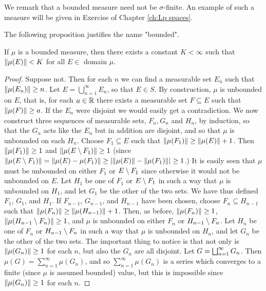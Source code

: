 We remark that a bounded measure need not be $\sigma$-finite. An example of such a measure will be given in Exercise of Chapter \ref{ch:Lp spaces}.

The following proposition justifies the name "bounded".

\begin{proposition}
\label{prop:bounded measure are bounded}
If $\mu$ is a bounded measure, then there exists a constant $K<\infty$ such that $\norm{\mu(E)}<K$ for all $E \in$ domain $\mu$.
\end{proposition}

\begin{proof}
Suppose not. Then for each $n$ we can find a measurable set $E_n$ such that $\norm{\mu(E_n)}\geq n$. Let $E=\bigcup_{n=1}^\infty E_n$, so that $E \in S$. By construction, $\mu$ is unbounded on $E$, that is, for each $a\in\mathbb{R}$ there exists a measurable set $F \subseteq E$ such that $\norm{\mu(F)}\geq a$. If the $E_n$ were disjoint we would easily get a contradiction. We now construct three sequences of measurable sets, $F_n, G_n$ and $H_n$, by induction, so that the $G_n$ acts like the $E_n$ but in addition are disjoint, and so that $\mu$ is unbounded on each $H_n$. Choose $F_1 \subseteq E$ such that $\norm{\mu(F_1)}\geq\norm{\mu(E)}+1$. Then $\norm{\mu(F_1)}\geq1$ and $\norm{\mu(E\setminus F_1)}\geq1$ (since $\norm{\mu(E\setminus F_1)}=\norm{\mu(E)-\mu(F_1)}\geq|\norm{\mu(E)}-\norm{\mu(F_1)}|\geq1$.) It is easily seen that $\mu$ must be unbounded on either $F_1$ or $E\setminus F_1$ since otherwise it would not be unbounded on $E$. Let $H_1$ be one of $F_1$ or $E\setminus F_1$ in such a way that $\mu$ is unbounded on $H_1$, and let $G_1$ be the other of the two sets. We have thus defined $F_1$, $G_1$, and $H_1$. If $F_{n-1}$, $G_{n-1}$, and $H_{n-1}$ have been chosen, choose $F_n\subseteq H_{n-1}$ such that $\norm{\mu(F_n)}\geq\norm{\mu(H_{n-1})}+1$. Then, as before, $\norm{\mu(F_n)}\geq1$, $\norm{\mu(H_{n-1}\setminus F_n)}\geq1$, and $\mu$ is unbounded on either $F_n$ or $H_{n-1}\setminus F_n$. Let $H_n$ be one of $F_n$ or $H_{n-1}\setminus F_n$ in such a way that $\mu$ is unbounded on $H_n$, and let $G_n$ be the other of the two sets. The important thing to notice is that not only is $\norm{\mu(G_n)}\geq1$ for each $n$, but also the $G_n$ are all disjoint. Let $G=\bigsqcup_{n=1}^\infty G_n$. Then $\mu(G)=\sum_{n=1}^\infty\mu(G_n)$, and so $\sum_{n=1}^\infty\mu(G_n)$ is a series which converges to a finite (since $\mu$ is assumed bounded) value, but this is impossible since $\norm{\mu(G_n)}\geq1$ for each $n$.
\end{proof}

